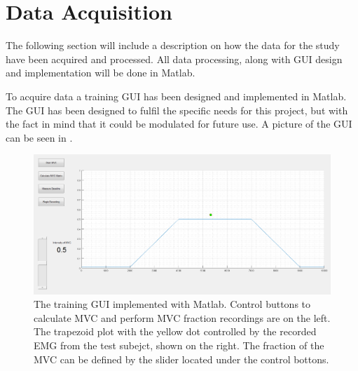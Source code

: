 \section{Data Acquisition}

The following section will include a description on how the data for the study have been acquired and processed. All data processing, along with GUI design and implementation will be done in Matlab.

To acquire data a training GUI has been designed and implemented in Matlab. The GUI has been designed to fulfil the specific needs for this project, but with the fact in mind that it could be modulated for future use. A picture of the GUI can be seen in . 




\begin{figure}[H]
	\includegraphics[width=.4\textwidth]{figures/GUI/GUI_Training.png}  %
	\caption{The training GUI implemented with Matlab. Control buttons to calculate MVC and perform MVC fraction recordings are on the left. The trapezoid plot with the yellow dot controlled by the recorded EMG from the test subejct, shown on the right. The fraction of the MVC can be defined by the slider located under the control bottons.}
	\label{fig:GUI_Training}
\end{figure} 








